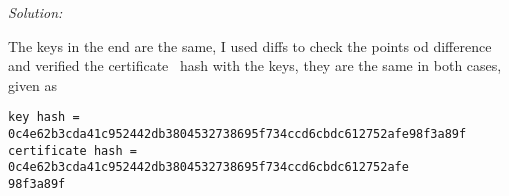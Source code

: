 \documentclass[a4paper,11pt]{article}
\newenvironment{solution}%
{\par{\noindent\small\textit{Solution:}}\vspace{-12pt}\begin{framed}}%
{\end{framed}\par}
\begin{document}
\begin{solution}
The keys in the end are the same, I used diffs to check the points od difference~\cite{web2} and verified the certificate~\cite{web3} hash with the keys, they are the same in both cases, given as
\begin{verbatim}
key hash = 0c4e62b3cda41c952442db3804532738695f734ccd6cbdc612752afe98f3a89f
certificate hash = 0c4e62b3cda41c952442db3804532738695f734ccd6cbdc612752afe
98f3a89f
\end{verbatim}

\end{solution}\fi



\end{document}
